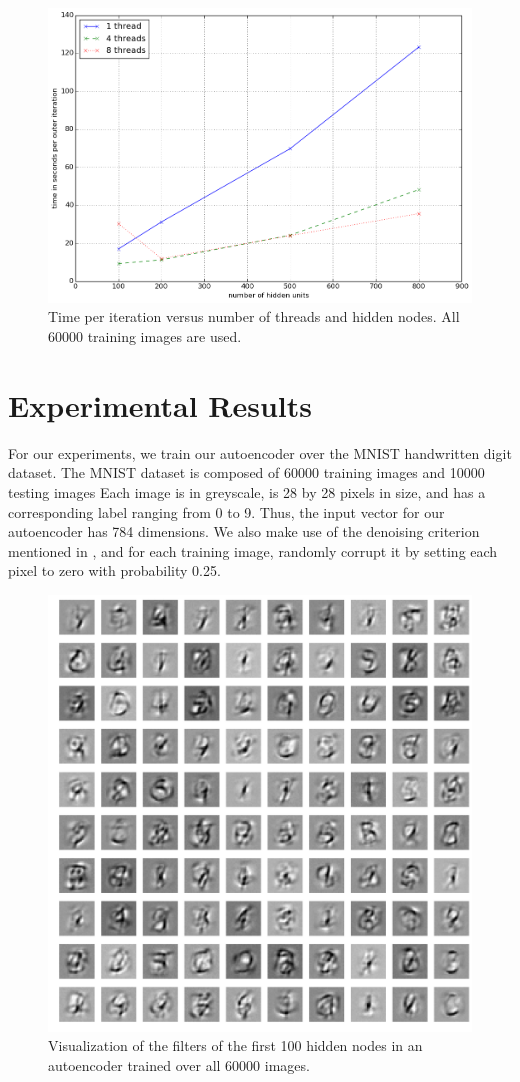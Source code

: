 \documentclass[conference]{IEEEtran}
\begin{document}
\begin{figure}[h]
\centering
\includegraphics[width=0.9\linewidth]{experiment2.png}
\caption{Time per iteration versus number of threads and hidden nodes. All 60000 training images are used.}
\label{fig:experiment2}
\end{figure}

\section{Experimental Results}
For our experiments, we train our autoencoder over the MNIST handwritten digit dataset. The MNIST dataset is composed of 60000 training images and 10000 testing images Each image is in greyscale, is 28 by 28 pixels in size, and has a corresponding label ranging from 0 to 9. Thus, the input vector for our autoencoder has 784 dimensions. We also make use of the denoising criterion mentioned in \cite{vincent2010stacked}, and for each training image, randomly corrupt it by setting each pixel to zero with probability 0.25. 

\begin{figure}[h]
\centering
\includegraphics[width=0.8\linewidth]{experiment3_1.png}
\caption{Visualization of the filters of the first 100 hidden nodes in an autoencoder trained over all 60000 images.}
\label{fig:experiment3_1}
\end{figure}
\end{document}
